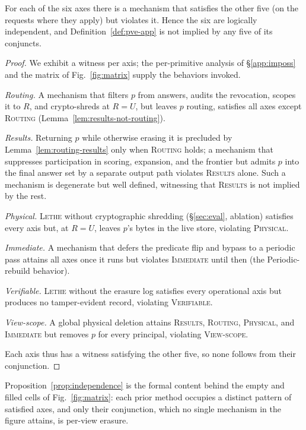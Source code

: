 \documentclass[sigconf, nonacm, review]{acmart}
\begin{document}
\begin{proposition}
\label{prop:independence}
For each of the six axes there is a mechanism that satisfies the other five
(on the requests where they apply) but violates it. Hence the six are
logically independent, and Definition~\ref{def:pve-app} is not implied by any
five of its conjuncts.
\end{proposition}
\begin{proof}
We exhibit a witness per axis; the per-primitive analysis of
\S\ref{app:imposs} and the matrix of Fig.~\ref{fig:matrix} supply the
behaviors invoked.

\emph{Routing.} A mechanism that filters $p$ from answers, audits the
revocation, scopes it to $R$, and crypto-shreds at $R=U$, but leaves $p$
routing, satisfies all axes except \textsc{Routing}
(Lemma~\ref{lem:results-not-routing}).

\emph{Results.} Returning $p$ while otherwise erasing it is precluded by
Lemma~\ref{lem:routing-results} only when \textsc{Routing} holds; a mechanism
that suppresses participation in scoring, expansion, and the frontier but
admits $p$ into the final answer set by a separate output path violates
\textsc{Results} alone. Such a mechanism is degenerate but well defined,
witnessing that \textsc{Results} is not implied by the rest.

\emph{Physical.} \textsc{Lethe} without cryptographic shredding
(\S\ref{sec:eval}, ablation) satisfies every axis but, at $R=U$, leaves $p$'s
bytes in the live store, violating \textsc{Physical}.

\emph{Immediate.} A mechanism that defers the predicate flip and bypass to a
periodic pass attains all axes once it runs but violates \textsc{Immediate}
until then (the Periodic-rebuild behavior).

\emph{Verifiable.} \textsc{Lethe} without the erasure log satisfies every
operational axis but produces no tamper-evident record, violating
\textsc{Verifiable}.

\emph{View-scope.} A global physical deletion attains \textsc{Results},
\textsc{Routing}, \textsc{Physical}, and \textsc{Immediate} but removes $p$
for every principal, violating \textsc{View-scope}.

Each axis thus has a witness satisfying the other five, so none follows from
their conjunction.
\end{proof}

Proposition~\ref{prop:independence} is the formal content behind the empty and
filled cells of Fig.~\ref{fig:matrix}: each prior method occupies a distinct
pattern of satisfied axes, and only their conjunction, which no single
mechanism in the figure attains, is per-view erasure.
\end{document}

